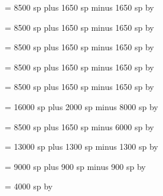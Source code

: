 \newskip\spacebeforeminor
\spacebeforeminor = 8500 sp plus 1650 sp minus 1650 sp
\multiply\spacebeforeminor by \factor

\newskip\spaceafterminor
\spaceafterminor = 8500 sp plus 1650 sp minus 1650 sp
\multiply\spaceafterminor by \factor

\newskip\spacebeforemaior
\spacebeforemaior = 8500 sp plus 1650 sp minus 1650 sp
\multiply\spacebeforemaior by \factor

\newskip\spaceaftermaior
\spaceaftermaior = 8500 sp plus 1650 sp minus 1650 sp
\multiply\spaceaftermaior by \factor

\newskip\spacebeforefinalis
\spacebeforefinalis = 8500 sp plus 1650 sp minus 1650 sp
\multiply\spacebeforefinalis by \factor

\newskip\spacebeforefinalfinalis
\spacebeforefinalfinalis= 16000 sp plus 2000 sp minus 8000 sp
\multiply\spacebeforefinalfinalis by \factor

\newskip\spaceafterfinalis
\spaceafterfinalis = 8500 sp plus 1650 sp minus 6000 sp
\multiply\spaceafterfinalis by \factor

\newskip\textbartextspace
\textbartextspace = 13000 sp plus 1300 sp minus 1300 sp
\multiply\textbartextspace by \factor

\newskip\notebarspace
\notebarspace = 9000 sp plus 900 sp minus 900 sp
\multiply\notebarspace by \factor

\newdimen\maximumspacewithoutdash
\maximumspacewithoutdash = 4000 sp
\multiply\maximumspacewithoutdash by \factor

\newskip\clefchangespace


\def\Abar{%
{\gregoriansymbolfont \char 64}%
\relax%
}

\def\Rbar{%
{\gregoriansymbolfont \char 65}%
\relax%
}

\def\Vbar{%
{\gregoriansymbolfont \char 66}%
\relax%
}

\def\gdagger{%
{\gregoriansymbolfont \char 68}%
\relax%
}

\def\gcross{%
{\gregoriansymbolfont \char 70}%
\relax%
}

\def\gstar{%
\gheightstar %
\relax%
}

